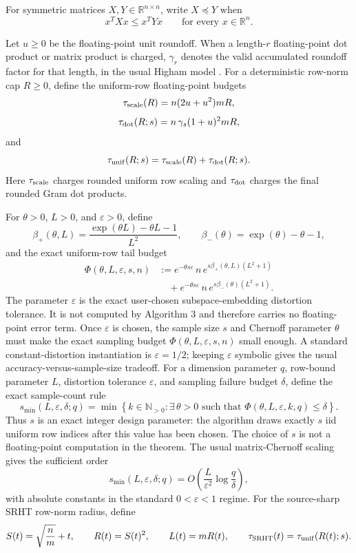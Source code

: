 \documentclass[11pt]{article}
\newcommand{\R}{\mathbb{R}}
\newcommand{\eps}{\varepsilon}
\theoremstyle{remark}
\begin{document}
For symmetric matrices \(X,Y\in\R^{n\times n}\), write \(X\preceq Y\) when
\[
  x^T X x\le x^T Y x
  \qquad\text{for every }x\in\R^n .
\]

Let \(u\ge0\) be the floating-point unit roundoff.  When a length-\(r\)
floating-point dot product or matrix product is charged, \(\gamma_r\) denotes
the valid accumulated roundoff factor for that length, in the usual Higham
model \cite{Higham2002}.  For a deterministic row-norm cap \(R\ge0\), define
the uniform-row floating-point budgets
\[
  \tau_{\rm scale}(R)
  =
  n(2u+u^2)mR,
\]
\[
  \tau_{\rm dot}(R;s)
  =
  n\,\gamma_s(1+u)^2mR,
\]
and
\[
  \tau_{\rm unif}(R;s)
  =
  \tau_{\rm scale}(R)+\tau_{\rm dot}(R;s).
\]
Here \(\tau_{\rm scale}\) charges rounded uniform row scaling and
\(\tau_{\rm dot}\) charges the final rounded Gram dot products.

For \(\theta>0\), \(L>0\), and \(\eps>0\), define
\[
  \beta_+(\theta,L)
  =
  \frac{\exp(\theta L)-\theta L-1}{L^2},
  \qquad
  \beta_-(\theta)
  =
  \exp(\theta)-\theta-1,
\]
and the exact uniform-row tail budget
\[
\begin{aligned}
  \Phi(\theta,L,\eps,s,n)
  &:=
  e^{-\theta s\eps}\,n\,
    e^{s\beta_+(\theta,L)(L^2+1)}
  \\
  &\quad+
  e^{-\theta s\eps}\,n\,
    e^{s\beta_-(\theta)(L^2+1)} .
\end{aligned}
\]
The parameter \(\eps\) is the exact user-chosen subspace-embedding distortion
tolerance.  It is not computed by Algorithm 3 and therefore carries no
floating-point error term.  Once \(\eps\) is chosen, the sample size \(s\) and
Chernoff parameter \(\theta\) must make the exact sampling budget
\(\Phi(\theta,L,\eps,s,n)\) small enough.  A standard constant-distortion
instantiation is \(\eps=1/2\); keeping \(\eps\) symbolic gives the usual
accuracy-versus-sample-size tradeoff.
For a dimension parameter \(q\), row-bound parameter \(L\), distortion
tolerance \(\eps\), and sampling failure budget \(\delta\), define the exact
sample-count rule
\[
  s_{\min}(L,\eps,\delta;q)
  =
  \min\left\{
    k\in\mathbb N_{>0}:
    \exists\,\theta>0\text{ such that }
    \Phi(\theta,L,\eps,k,q)\le\delta
  \right\}.
\]
Thus \(s\) is an exact integer design parameter: the algorithm draws exactly
\(s\) iid uniform row indices after this value has been chosen.  The choice of
\(s\) is not a floating-point computation in the theorem.  The usual
matrix-Chernoff scaling \cite{Tropp2012} gives the sufficient order
\[
  s_{\min}(L,\eps,\delta;q)
  =
  O\!\left(\frac{L}{\eps^2}\log\frac{q}{\delta}\right),
\]
with absolute constants in the standard \(0<\eps<1\) regime.
For the source-sharp SRHT row-norm radius, define
\[
  S(t)=\sqrt{\frac nm}+t,\qquad
  R(t)=S(t)^2,\qquad
  L(t)=mR(t),\qquad
  \tau_{\rm SRHT}(t)=\tau_{\rm unif}(R(t);s).
\]
\end{document}
